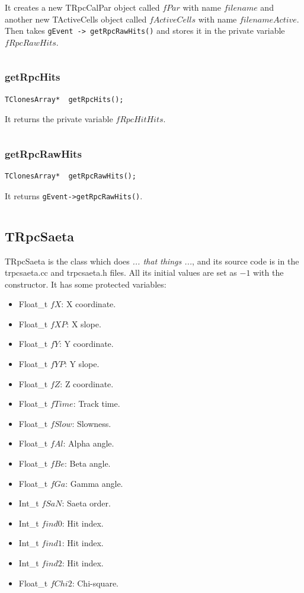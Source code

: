 \documentclass[a4paper]{book}
\begin{document}
It creates a new TRpcCalPar object called $fPar$ with name $filename$ and another new TActiveCells object called $fActiveCells$ with name $filenameActive$. Then takes \texttt{gEvent -> getRpcRawHits()} and stores it in the private variable $fRpcRawHits$.

\[\]

\subsubsection{getRpcHits}

\begin{lstlisting}[style=customc]
TClonesArray*  getRpcHits();
\end{lstlisting}

It returns the private variable $fRpcHitHits$.

\[\]

\subsubsection{getRpcRawHits}

\begin{lstlisting}[style=customc]
TClonesArray*  getRpcRawHits();
\end{lstlisting}

It returns \texttt{gEvent->getRpcRawHits()}.

\[\]

\subsection{TRpcSaeta}

TRpcSaeta is the class which does \textit{... that things ...}, and its source code is in the trpcsaeta.cc and trpcsaeta.h files. All its initial values are set as $-1$ with the constructor. It has some protected variables:

\begin{itemize}
	\item Float\_t $fX$: X coordinate.
	\item Float\_t $fXP$: X slope.
	\item Float\_t $fY$: Y coordinate.
	\item Float\_t $fYP$: Y slope.
	\item Float\_t $fZ$: Z coordinate.
	\item Float\_t $fTime$: Track time.
	\item Float\_t $fSlow$: Slowness.
	\item Float\_t $fAl$: Alpha angle.
	\item Float\_t $fBe$: Beta angle.
	\item Float\_t $fGa$: Gamma angle.
	\item Int\_t   $fSaN$: Saeta order.
	\item Int\_t   $find0$: Hit index.
	\item Int\_t   $find1$: Hit index.
	\item Int\_t   $find2$: Hit index.
	\item Float\_t $fChi2$: Chi-square.
\end{itemize}
\end{document}
